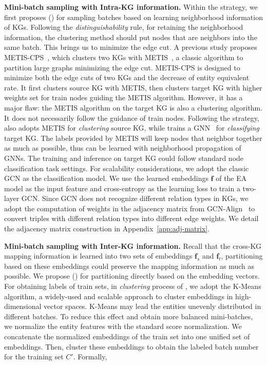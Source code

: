 \noindent
\textbf{Mini-batch sampling with Intra-KG information.} Within the \Sampling{} strategy, we first proposes \MetisFullName{} (\MetisGCN{}) for sampling batches based on learning neighborhood information of KGs. Following the  \emph{distinguishability} rule, for retaining the neighborhood information, the clustering method should put nodes that are neighbors into the same batch. This brings us to minimize the edge cut. A previous study proposes METIS-CPS~\cite{LargeEA22}, which clusters two KGs with METIS~\cite{METIS98}, a classic algorithm to partition large graphs minimizing the edge cut. METIS-CPS is designed to minimize both the edge cuts of two KGs and the decrease of entity equivalent rate. It first clusters source KG with METIS, then clusters target KG with higher weights set for train nodes guiding the METIS algorithm. However, it has a major flaw: the METIS algorithm on the target KG is also a clustering algorithm. It does not necessarily follow the guidance of train nodes. Following the \Sampling{} strategy,  \MetisGCN{} also adopts METIS for \emph{clustering} source KG, while trains a GNN~\cite{GCN17} for \emph{classifying} target KG. The labels provided by METIS will keep nodes that neighbor together as much as possible, thus can be learned with neighborhood propagation of GNNs. The training and inference on target KG could follow standard node classification task settings. For scalability considerations, we adopt the classic GCN as the classification model. We use the learned embeddings $\mathbf{f}$ of the EA model as the input feature and cross-entropy as the learning loss to train a two-layer GCN. Since GCN does not recognize different relation types in KGs, we adopt the computation of weights in the adjacency matrix from GCN-Align~\cite{GCN-Align18} to convert triples with different relation types into different edge weights. We detail the adjacency matrix construction in Appendix~\ref{app:adj-matrix}.

\noindent
\textbf{Mini-batch sampling with Inter-KG information.} Recall that the cross-KG mapping information is learned into two sets of embeddings $\mathbf{f}_s$ and $\mathbf{f}_t$, partitioning based on these embeddings could preserve the mapping information as much as possible. We propose \KMeansFullName{} (\KMeans{}) for partitioning directly based on the embedding vectors.  
For obtaining labels of train sets, in \emph{clustering} process of \KMeans{}, we adopt the K-Means algorithm, a widely-used and scalable approach to cluster embeddings in high-dimensional vector spaces.
K-Means may lead the entities unevenly distributed in different batches. To reduce this effect and obtain more balanced mini-batches, we normalize the entity features with the standard score normalization. We concatenate the normalized embeddings of the train set into one unified set of embeddings. Then, cluster these embeddings to obtain the labeled batch number for the training set $C'$. Formally, 

